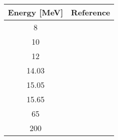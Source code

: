 \begin{tabular}{|c||c|} 
    \hline 
    \bf{Energy [MeV]} & \bf{Reference} \\
    \hline
    \hline 
    8 & \cite{Liers71}\\
    10 & \cite{Liers71}\\
    12 & \cite{Liers71}\\
    14.03 & \cite{Lombardi72}\\
    15.05 & \cite{Lombardi72}\\
    15.65 & \cite{Lombardi72}\\
    65 & \cite{Noro81}\\
    200 & \cite{Murdock87}\\
    \hline
\end{tabular}
